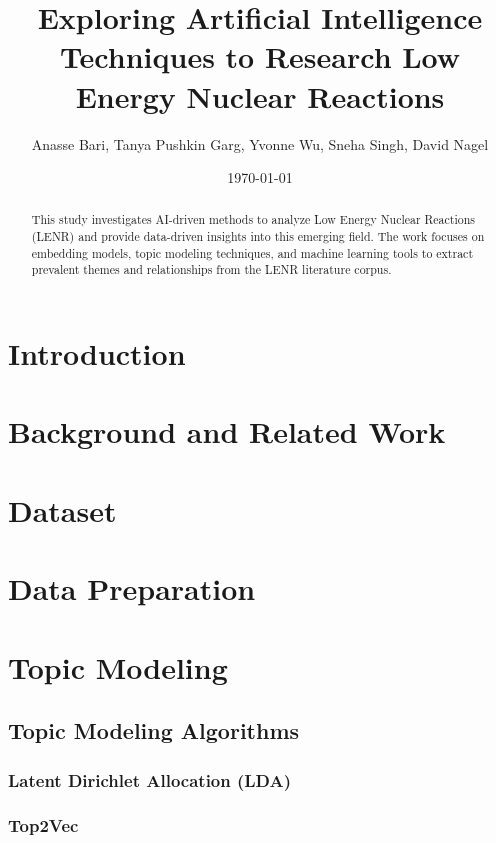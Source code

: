 \documentclass[12pt]{article}
\title{Exploring Artificial Intelligence Techniques to Research Low Energy Nuclear Reactions}
\author{Anasse Bari, Tanya Pushkin Garg, Yvonne Wu, Sneha Singh, David Nagel}
\date{\today}
\begin{document}
\maketitle

\begin{abstract}
    This study investigates AI-driven methods to analyze Low Energy Nuclear Reactions (LENR) and provide data-driven insights into this emerging field. The work focuses on embedding models, topic modeling techniques, and machine learning tools to extract prevalent themes and relationships from the LENR literature corpus.
\end{abstract}

\section{Introduction}
    

\section{Background and Related Work}
    

\section{Dataset}
    

\section{Data Preparation}
    

\section{Topic Modeling}
    \subsection{Topic Modeling Algorithms}
        \subsubsection{Latent Dirichlet Allocation (LDA)}
            
        \subsubsection{Top2Vec}
            
\end{document}
